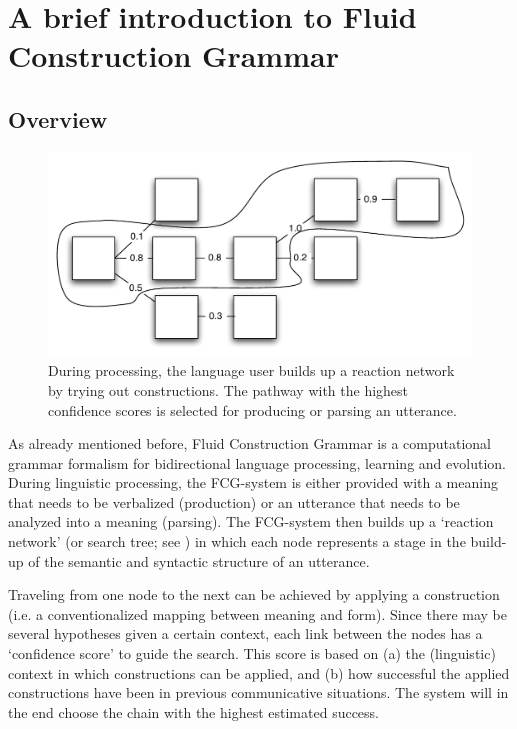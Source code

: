 \section{A brief introduction to Fluid Construction Grammar}

\subsection{Overview}
\begin{figure}
\centerline{\includegraphics[width=0.8\linewidth]{Chapter2/figs/reaction-network}}
  \caption[A reaction network]{During processing, the language user builds up a reaction network by trying out constructions. The pathway with the highest confidence scores is selected for producing or parsing an utterance.}
   \label{f:reaction}
\end{figure}

As already mentioned before, Fluid Construction Grammar is a computational grammar formalism for bidirectional language processing, learning and evolution. During linguistic processing, the FCG-system is either provided with a meaning that needs to be verbalized (production) or an utterance that needs to be analyzed into a meaning (parsing). The FCG-system then builds up a `reaction network' (or search tree; see ) in which each node represents a stage in the build-up of the semantic and syntactic structure of an utterance. 

Traveling from one node to the next can be achieved by applying a construction (i.e. a conventionalized mapping between meaning and form). Since there may be several hypotheses given a certain context, each link between the nodes has a `confidence score' to guide the search. This score is based on (a) the (linguistic) context in which constructions can be applied, and (b) how successful the applied constructions have been in previous communicative situations. The system will in the end choose the chain with the highest estimated success.


